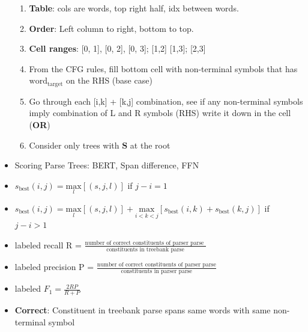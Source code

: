 \documentclass[10pt, landscape]{article}
\begin{document}
\begin{multicols*}{4}
\begin{itemize}
\begin{enumerate}
      \item \textbf{Table}: cols are words, top right half, idx between words.
      \item \textbf{Order}: Left column to right, bottom to top.
      \item \textbf{Cell ranges}: [0, 1], [0, 2], [0, 3]; [1,2] [1,3]; [2,3]
      \item From the CFG rules, fill bottom cell with non-terminal symbols that has $\text{word}_{\text{target}}$ on the RHS (base case)
      \item Go through each [i,k] + [k,j] combination, see if any non-terminal symbols imply combination of L and R symbols (RHS) write it down in the cell (\textbf{OR})
      \item Consider only trees with $\textbf{S}$ at the root
    \end{enumerate}
    \item Scoring Parse Trees: BERT, Span difference, FFN
    \item $s_{\text{best}}(i,j) = \underset{l}{\text{max}}[(s,j,l)]$ if $j-i = 1$
    \item $s_{\text{best}}(i,j) = \underset{l}{\text{max}}[(s,j,l)]+ \underset{i<k<j}{\text{max}}[s_{\text{best}}(i,k) + s_{\text{best}}(k,j)] $ if $j-i > 1$
    \item labeled recall R = $\frac{\text{number of correct constituents of parser parse }}{\text{constituents in treebank parse}}$
    \item labeled precision P = $\frac{\text{number of correct constituents of parser parse}}{\text{constituents in parser parse}}$
    \item labeled $F_1 = \frac{2RP}{R+P}$
    \item \textbf{Correct}: Constituent in treebank parse spans same words with same non-terminal symbol
  \end{itemize}


\end{multicols*}
\end{document}
